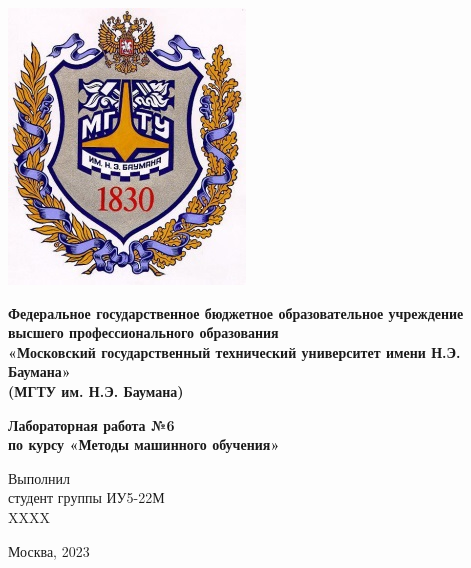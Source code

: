 \documentclass[a4paper]{article}
\begin{document}
  \fontsize{14}{16}\selectfont

  \begin{titlepage}
    \begin{minipage}{0.2\textwidth}
      \includegraphics[scale=0.4]{logo}
    \end{minipage}
    \begin{minipage}{0.7\textwidth}\centering
      \fontsize{10}{12}\selectfont
      \textbf{
        Федеральное государственное бюджетное образовательное учреждение \\
        высшего профессионального образования \\
        «Московский государственный технический университет имени Н.Э. Баумана» \\
        (МГТУ им. Н.Э. Баумана)
      }
    \end{minipage}

    \vspace{5cm}
    \centering
    \fontsize{16}{20}\textbf{
      Лабораторная работа №6 \\
      по курсу «Методы машинного обучения» \\
    }

    \vspace{5cm}
    \begin{flushright}
    Выполнил \\
    студент группы ИУ5-22М \\
    XXXX \\
    \end{flushright}
    \vspace*{\fill}
    Москва, 2023
  \end{titlepage}

  \justifying
  \setlength{\parindent}{1.25cm}
\end{document}
